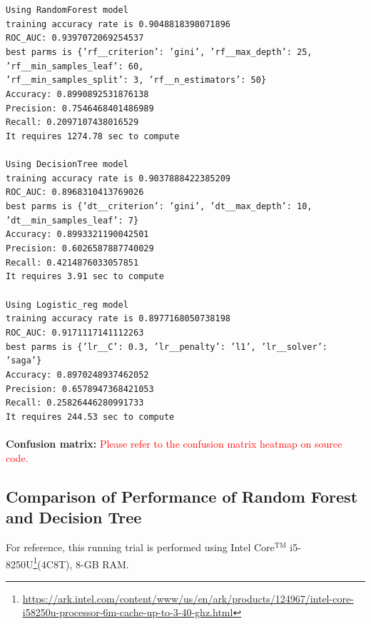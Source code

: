 \documentclass[11pt,a4paper]{article}
\begin{document}
    \noindent
    \texttt{Using RandomForest model \\
    training accuracy rate is 0.9048818398071896 \\
    ROC\_AUC: 0.9397072069254537 \\
    best parms is \{'rf\_\_criterion': 'gini', 'rf\_\_max\_depth': 25, 'rf\_\_min\_samples\_leaf': 60, \\ 'rf\_\_min\_samples\_split': 3, 'rf\_\_n\_estimators': 50\} \\
    Accuracy: 0.8990892531876138 \\
    Precision: 0.7546468401486989 \\
    Recall: 0.2097107438016529 \\
    It requires 1274.78 sec to compute \\
    \\
    Using DecisionTree model \\
    training accuracy rate is 0.9037888422385209 \\
    ROC\_AUC: 0.8968310413769026 \\
    best parms is \{'dt\_\_criterion': 'gini', 'dt\_\_max\_depth': 10, 'dt\_\_min\_samples\_leaf': 7\} \\
    Accuracy: 0.8993321190042501 \\
    Precision: 0.6026587887740029 \\
    Recall: 0.4214876033057851 \\
    It requires 3.91 sec to compute \\
    \\
    Using Logistic\_reg model \\
    training accuracy rate is 0.8977168050738198 \\
    ROC\_AUC: 0.9171117141112263 \\
    best parms is \{'lr\_\_C': 0.3, 'lr\_\_penalty': 'l1', 'lr\_\_solver': 'saga'\} \\
    Accuracy: 0.8970248937462052 \\
    Precision: 0.6578947368421053 \\
    Recall: 0.25826446280991733 \\
    It requires 244.53 sec to compute} \\
    \\
    \textbf{Confusion matrix:} \textcolor{red}{Please refer to the confusion matrix heatmap on source code.}
    

    \subsection{Comparison of Performance of Random Forest and Decision Tree}
    For reference, this running trial is performed using Intel Core$^{\text{TM}}$ i5-8250U\footnote{\url{https://ark.intel.com/content/www/us/en/ark/products/124967/intel-core-i58250u-processor-6m-cache-up-to-3-40-ghz.html}}(4C8T), 8-GB RAM.
    
\end{document}

